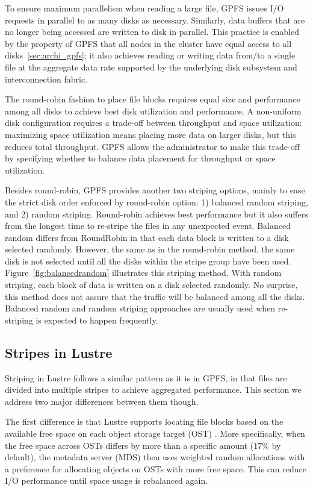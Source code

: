 To ensure maximum parallelism when reading a large file, GPFS issues 
I/O requests in parallel to as many disks as necessary.
%
Similarly, data buffers that are no longer being accessed are written 
to disk in parallel.
%
This practice is enabled by the property of GPFS that all nodes in the cluster
have equal access to all disks~\ref{sec:archi_gpfs};
it also achieves reading or writing data from/to a single file at the 
aggregate data rate supported by the underlying disk subsystem and 
interconnection fabric.

The round-robin fashion to place file blocks requires equal size and performance
among all disks to achieve best disk utilization and performance.
%
A non-uniform disk configuration requires a trade-off between throughput and space
utilization: maximizing space utilization means placing more data on larger disks, 
but this reduces total throughput.
%
GPFS allows the administrator to make this trade-off by specifying
whether to balance data placement for throughput or space utilization.

Besides round-robin, GPFS provides another two striping options, mainly
to ease the strict disk order enforced by round-robin option:
1) balanced random striping, and
2) random striping.
%
Round-robin achieves best performance but it also suffers from the longest
time to re-stripe the files in any unexpected event.
%
Balanced random differs from RoundRobin in that each data 
block is written to a disk selected randomly. 
%
However, the same as in the round-robin  method, the same disk is not 
selected until all the disks within the stripe group have been used.
%
Figure~\ref{fig:balancedrandom} illustrates this striping method.
%
With random striping, each block of data is written on a disk 
selected randomly. 
%
No surprise, this method does not assure that the traffic will be 
balanced among all the disks.
%
Balanced random and random striping approaches are usually used when 
re-striping is expected to happen frequently.



\subsection{Stripes in Lustre}
\label{sec:stripe_Lustre}
%
Striping in Lustre follows a similar pattern as it is in GPFS, in that files 
are divided into multiple stripes to achieve aggregated performance.
%
This section we address two major differences between them though.

The first difference is that Lustre supports locating file blocks based on 
the available free space on each object storage target (OST)
\cite{Schwan2003,braamlustre}.
%
More specifically, when the free space across OSTs differs by more than 
a specific amount (17\% by default), the metadata server (MDS) then uses 
weighted random allocations with a preference for allocating objects on OSTs 
with more free space.
%
This can reduce I/O performance until space usage is rebalanced again.

